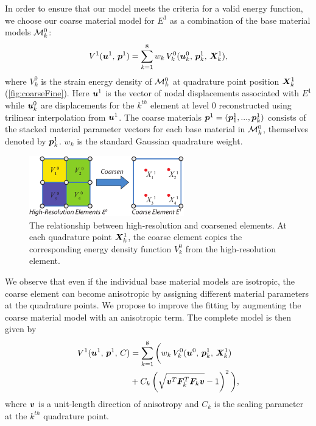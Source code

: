 In order to ensure that our model meets the criteria for a valid energy function, we choose our coarse material model for $\mathit{E}^1$ as a combination of the base material models $\mathcal{M}_k^0$:
\begin{align}
V^1(\bm{u}^1, \, \bm{p}^1) = \sum_{k=1}^8 w_k \, V_k^0(\bm{u}_k^0, \, \bm{p}_k^1, \, \bm{X}_k^1),
\label{eq:materialModel}
\end{align}
where $V_k^0$ is the strain energy density of $\mathcal{M}_k^0$ at quadrature point position $\bm{X}_k^1$ (\autoref{fig:coarseFine}). Here $\bm{u}^1$ is the vector of nodal displacements associated with $\mathit{E}^1$ while $\bm{u}_k^0$ are displacements for the $k^{th}$ element at level $0$ reconstructed using trilinear interpolation from $\bm{u}^1$.
The coarse materials $\bm{p}^1=(\bm{p}_1^1,...,\bm{p}_k^1)$ consists of the stacked material parameter vectors for each base material in $\mathcal{M}_k^0$, themselves denoted by $\bm{p}_k^1$.  $w_k$ is the standard Gaussian quadrature weight.
\begin{figure}
	\centering
	\includegraphics[width=0.6\textwidth]{images/coarseFine.pdf}
	\caption{The relationship between high-resolution and coarsened elements. At each quadrature point $\bm{X}_k^1$, the coarse element copies the corresponding energy density function $V_k^0$ from the high-resolution element.}
	\label{fig:coarseFine}
\end{figure}
We observe that even if the individual base material models are isotropic, the coarse element can become anisotropic by assigning different material parameters at the quadrature points.
We propose to improve the fitting by augmenting the coarse material model with an anisotropic term.
The complete model is then given by
\begin{align}
\begin{split}
V^1(\bm{u}^1, \, \bm{p}^1, \, C) &= \sum_{k=1}^8 \bigg( w_k \, V_k^0(\bm{u}^0, \,\bm{p}_k^1, \, \bm{X}_k^1)\\
& + C_k\left( \sqrt{\bm{v}^T\bm{F}_k^T\bm{F}_k\bm{v}} - 1\right)^2\bigg),\\
\label{eq:materialModel2}
\end{split}
\end{align}
where $\bm{v}$ is a unit-length direction of anisotropy and $C_k$ is the scaling parameter at the $k^{th}$ quadrature point. 

